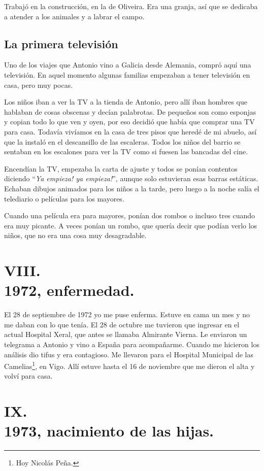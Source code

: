 \documentclass[12pt,a5paper]{book}
\begin{document}
Trabajó en la construcción, en la de Oliveira. Era una granja, así que se dedicaba a atender a los animales y a labrar el campo.


\subsection*{La primera televisión}

Uno de los viajes que Antonio vino a Galicia desde Alemania, compró aquí una televisión. En aquel momento algunas familias empezaban a tener televisión en casa, pero muy pocas.

Los niños iban a ver la TV a la tienda de Antonio, pero allí iban hombres que hablaban de cosas obscenas y decían palabrotas. De pequeños son como esponjas y copian todo lo que ven y oyen, por eso decidió que había que comprar una TV para casa. Todavía vivíamos en la casa de tres pisos que heredé de mi abuelo, así que la instaló en el descansillo de las escaleras. Todos los niños del barrio se sentaban en los escalones para ver la TV como si fuesen las bancadas del cine.

Encendían la TV, empezaba la carta de ajuste y todos se ponían contentos diciendo ``\textit{Ya empieza! ya empieza!}'', aunque solo estuvieran esas barras estáticas. Echaban dibujos animados para los niños a la tarde, pero luego a la noche salía el telediario o películas para los mayores.

Cuando una película era para mayores, ponían dos rombos o incluso tres cuando era muy picante. A veces ponían un rombo, que quería decir que podían verlo los niños, que no era una cosa muy desagradable.



\section*{VIII.\\1972, enfermedad.}

El 28 de septiembre de 1972 yo me puse enferma. Estuve en cama un mes y no me daban con lo que tenía. El 28 de octubre me tuvieron que ingresar en el actual Hospital Xeral, que antes se llamaba Almirante Vierna. Le enviaron un telegrama a Antonio y vino a España para acompañarme. Cuando me hicieron los análisis dio tifus y era contagioso. Me llevaron para el Hospital Municipal de las Camelias\footnote{Hoy Nicolás Peña.}, en Vigo. Allí estuve hasta el 16 de noviembre que me dieron el alta y volví para casa.


\section*{IX.\\1973, nacimiento de las hijas.}
\end{document}
